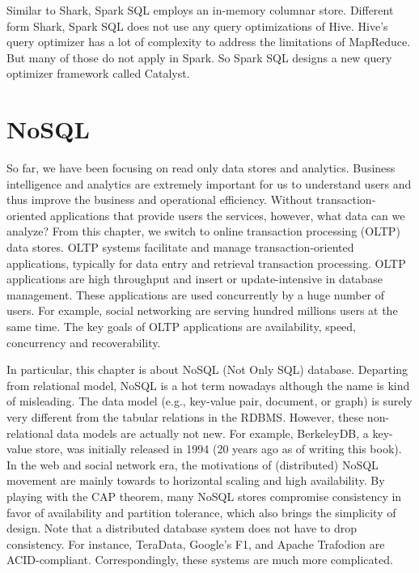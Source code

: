 \documentclass[12pt]{book}
\begin{document}
Similar to Shark, Spark SQL employs an in-memory columnar store. Different form Shark, Spark SQL does not use any query optimizations of Hive. Hive's query optimizer has a lot of complexity to address the limitations of MapReduce. But many of those do not apply in Spark. So Spark SQL designs a new query optimizer framework called Catalyst.

\chapter[NoSQL]
{NoSQL}
So far, we have been focusing on read only data stores and analytics. Business intelligence and analytics are extremely important for us to understand users and thus improve the business and operational efficiency. Without transaction-oriented applications that provide users the services, however, what data can we analyze? From this chapter, we switch to online transaction processing (OLTP) data stores. OLTP systems facilitate and manage transaction-oriented applications, typically for data entry and retrieval transaction processing. OLTP applications are high throughput and insert or update-intensive in database management. These applications are used concurrently by a huge number of users. For example, social networking are serving hundred millions users at the same time. The key goals of OLTP applications are availability, speed, concurrency and recoverability.

In particular, this chapter is about NoSQL (Not Only SQL) database. Departing from relational model,  NoSQL is a hot term nowadays although the name is kind of misleading. The data model (e.g., key-value pair, document, or graph) is surely very different from the tabular relations in the RDBMS. However, these non-relational data models are actually not new. For example, BerkeleyDB, a key-value store, was initially released in 1994 (20 years ago as of writing this book). In the web and social network era, the motivations of (distributed) NoSQL movement are mainly towards to horizontal scaling and high availability. By playing with the CAP theorem, many NoSQL stores compromise consistency in favor of availability and partition tolerance, which also brings the simplicity of design. Note that a distributed database system does not have to drop consistency. For instance, TeraData, Google's F1, and Apache Trafodion are ACID-compliant. Correspondingly, these systems are much more complicated.
\end{document}
